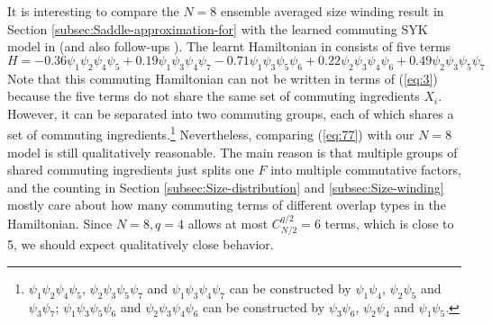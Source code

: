 \documentclass[11pt]{article}
\renewcommand{\>}{\rangle}
\newcommand{\<}{\langle}
\begin{document}
It is interesting to compare the $N=8$ ensemble averaged size winding
result in Section \ref{subsec:Saddle-approximation-for} with the
learned commuting SYK model in \cite{Jafferis:2022crx}  (and also follow-ups \cite{Kobrin:2023rzr,Jafferis:2023moh}).
The learnt Hamiltonian in \cite{Jafferis:2022crx}  consists of five terms
\begin{equation}
H=-0.36\psi_{1}\psi_{2}\psi_{4}\psi_{5}+0.19\psi_{1}\psi_{3}\psi_{4}\psi_{7}-0.71\psi_{1}\psi_{3}\psi_{5}\psi_{6}+0.22\psi_{2}\psi_{3}\psi_{4}\psi_{6}+0.49\psi_{2}\psi_{3}\psi_{5}\psi_{7}\label{eq:77}
\end{equation}
Note that this commuting Hamiltonian can not be written in terms of
(\ref{eq:3}) because the five terms do not share the same set of
commuting ingredients $X_{i}$. However, it can be separated into
two commuting groups, each of which shares a set of commuting ingredients.\footnote{$\psi_{1}\psi_{2}\psi_{4}\psi_{5}$, $\psi_{2}\psi_{3}\psi_{5}\psi_{7}$
and $\psi_{1}\psi_{3}\psi_{4}\psi_{7}$ can be constructed by $\psi_{1}\psi_{4}$,
$\psi_{2}\psi_{5}$ and $\psi_{3}\psi_{7}$; $\psi_{1}\psi_{3}\psi_{5}\psi_{6}$
and $\psi_{2}\psi_{3}\psi_{4}\psi_{6}$ can be constructed by $\psi_{3}\psi_{6}$,
$\psi_{2}\psi_{4}$ and $\psi_{1}\psi_{5}$.} Nevertheless, comparing (\ref{eq:77}) with our $N=8$ model is still
qualitatively reasonable. The main reason is that multiple groups
of shared commuting ingredients just splits one $F$ into multiple
commutative factors, and the counting in Section \ref{subsec:Size-distribution}
and \ref{subsec:Size-winding} mostly care about how many commuting
terms of different overlap types in the Hamiltonian. Since $N=8,q=4$
allows at most $C_{N/2}^{q/2}=6$ terms, which is close to 5, we should
expect qualitatively close behavior.
\end{document}
